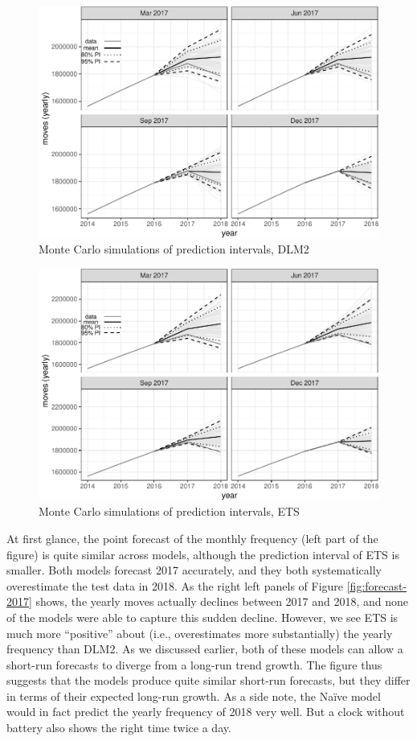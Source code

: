 \documentclass[]{article}
\begin{document}
\begin{figure}
\centering
\includegraphics{../figs/freq--mc-intervals-dlm-1.pdf}
\caption{\label{fig:mc-intervals-dlm}Monte Carlo simulations of prediction
intervals, DLM2}
\end{figure}

\begin{figure}
\centering
\includegraphics{../figs/freq--mc-intervals-ets-1.pdf}
\caption{\label{fig:mc-intervals-ets}Monte Carlo simulations of prediction
intervals, ETS}
\end{figure}

At first glance, the point forecast of the monthly frequency (left part
of the figure) is quite similar across models, although the prediction
interval of ETS is smaller. Both models forecast 2017 accurately, and
they both systematically overestimate the test data in 2018. As the
right left panels of Figure \ref{fig:forecast-2017} shows, the yearly
moves actually declines between 2017 and 2018, and none of the models
were able to capture this sudden decline. However, we see ETS is much
more ``positive'' about (i.e., overestimates more substantially) the
yearly frequency than DLM2. As we discussed earlier, both of these
models can allow a short-run forecasts to diverge from a long-run trend
growth. The figure thus suggests that the models produce quite similar
short-run forecasts, but they differ in terms of their expected long-run
growth. As a side note, the Naïve model would in fact predict the yearly
frequency of 2018 very well. But a clock without battery also shows the
right time twice a day.
\end{document}
